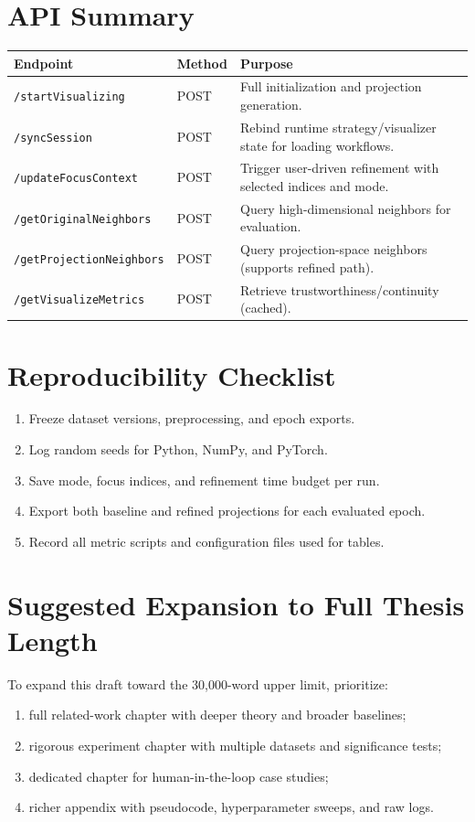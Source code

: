 \documentclass[12pt,a4paper]{report}
\begin{document}
\cleardoublepage



\appendix

\chapter{API Summary}
\begin{longtable}{p{}p{}p{}}
\toprule
Endpoint & Method & Purpose \\
\midrule
\texttt{/startVisualizing} & POST & Full initialization and projection generation. \\
\texttt{/syncSession} & POST & Rebind runtime strategy/visualizer state for loading workflows. \\
\texttt{/updateFocusContext} & POST & Trigger user-driven refinement with selected indices and mode. \\
\texttt{/getOriginalNeighbors} & POST & Query high-dimensional neighbors for evaluation. \\
\texttt{/getProjectionNeighbors} & POST & Query projection-space neighbors (supports refined path). \\
\texttt{/getVisualizeMetrics} & POST & Retrieve trustworthiness/continuity (cached). \\
\bottomrule
\end{longtable}

\chapter{Reproducibility Checklist}
\begin{enumerate}
\item Freeze dataset versions, preprocessing, and epoch exports.
\item Log random seeds for Python, NumPy, and PyTorch.
\item Save mode, focus indices, and refinement time budget per run.
\item Export both baseline and refined projections for each evaluated epoch.
\item Record all metric scripts and configuration files used for tables.
\end{enumerate}

\chapter{Suggested Expansion to Full Thesis Length}
To expand this draft toward the 30,000-word upper limit, prioritize:
\begin{enumerate}
\item full related-work chapter with deeper theory and broader baselines;
\item rigorous experiment chapter with multiple datasets and significance tests;
\item dedicated chapter for human-in-the-loop case studies;
\item richer appendix with pseudocode, hyperparameter sweeps, and raw logs.
\end{enumerate}
\end{document}
